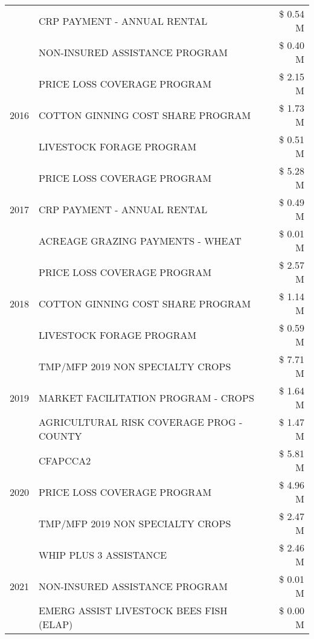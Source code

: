 \begin{tabular}{llr}
 & CRP PAYMENT - ANNUAL RENTAL & \$ 0.54 M \\
 & NON-INSURED ASSISTANCE PROGRAM & \$ 0.40 M \\
\cline{1-3}
\multirow[t]{3}{*}{2016} & PRICE LOSS COVERAGE PROGRAM & \$ 2.15 M \\
 & COTTON GINNING COST SHARE PROGRAM & \$ 1.73 M \\
 & LIVESTOCK FORAGE PROGRAM & \$ 0.51 M \\
\cline{1-3}
\multirow[t]{3}{*}{2017} & PRICE LOSS COVERAGE PROGRAM & \$ 5.28 M \\
 & CRP PAYMENT - ANNUAL RENTAL & \$ 0.49 M \\
 & ACREAGE GRAZING PAYMENTS - WHEAT & \$ 0.01 M \\
\cline{1-3}
\multirow[t]{3}{*}{2018} & PRICE LOSS COVERAGE PROGRAM & \$ 2.57 M \\
 & COTTON GINNING COST SHARE PROGRAM & \$ 1.14 M \\
 & LIVESTOCK FORAGE PROGRAM & \$ 0.59 M \\
\cline{1-3}
\multirow[t]{3}{*}{2019} & TMP/MFP 2019 NON SPECIALTY CROPS & \$ 7.71 M \\
 & MARKET FACILITATION PROGRAM - CROPS & \$ 1.64 M \\
 & AGRICULTURAL RISK COVERAGE PROG - COUNTY & \$ 1.47 M \\
\cline{1-3}
\multirow[t]{3}{*}{2020} & CFAPCCA2 & \$ 5.81 M \\
 & PRICE LOSS COVERAGE PROGRAM & \$ 4.96 M \\
 & TMP/MFP 2019 NON SPECIALTY CROPS & \$ 2.47 M \\
\cline{1-3}
\multirow[t]{3}{*}{2021} & WHIP PLUS 3 ASSISTANCE & \$ 2.46 M \\
 & NON-INSURED ASSISTANCE PROGRAM & \$ 0.01 M \\
 & EMERG ASSIST LIVESTOCK BEES FISH (ELAP) & \$ 0.00 M \\
\cline{1-3}
\bottomrule
\end{tabular}
